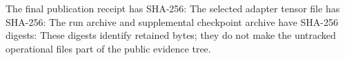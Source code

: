 The final publication receipt has SHA-256:
The selected adapter tensor file has SHA-256:
The run archive and supplemental checkpoint archive have SHA-256 digests:
These digests identify retained bytes; they do not make the
untracked operational files part of the public evidence tree.
